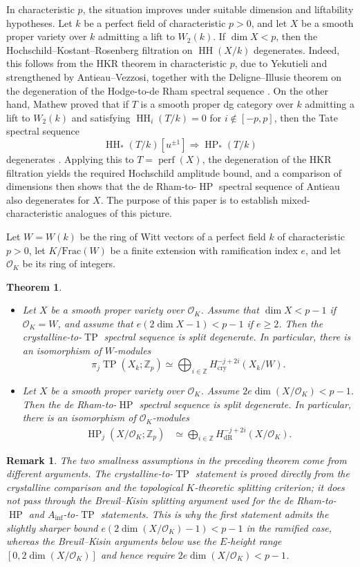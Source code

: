 \documentclass[11pt]{amsart}
\newtheorem{theorem}[lemma]{Theorem}
\newtheorem{remark}[lemma]{Remark}
\numberwithin{equation}{section}
\newcommand{\Z}{\mathbb{Z}}
\newcommand{\sO}{\mathcal{O}}
\newcommand{\dR}{\operatorname{{dR}}}
\newcommand{\perf}{\operatorname{perf}}
\newcommand{\cry}{\operatorname{cry}}
\numberwithin{equation}{section}
\newcommand{\Ainf}{A_{\operatorname{inf}}}
\newcommand{\HH}{\operatorname{HH}}
\newcommand{\TP}{\operatorname{TP}}
\newcommand{\HP}{\operatorname{HP}}
\begin{document}
In characteristic $p$, the situation improves under suitable dimension and liftability hypotheses. Let $k$ be a perfect field of characteristic $p>0$, and let $X$ be a smooth proper variety over $k$ admitting a lift to $W_2(k)$. If $\dim X<p$, then the Hochschild--Kostant--Rosenberg filtration on $\HH(X/k)$ degenerates. Indeed, this follows from the HKR theorem in characteristic $p$, due to Yekutieli and strengthened by Antieau--Vezzosi, together with the Deligne--Illusie theorem on the degeneration of the Hodge-to-de Rham spectral sequence \cite{Y02,AV20,DI87}. On the other hand, Mathew proved that if $T$ is a smooth proper dg category over $k$ admitting a lift to $W_2(k)$ and satisfying $\HH_i(T/k)=0$ for $i\notin[-p,p]$, then the Tate spectral sequence
\[
\HH_*(T/k)[u^{\pm1}] \Longrightarrow \HP_*(T/k)
\]
degenerates \cite[Theorem~1.2]{M20b}. Applying this to $T=\perf(X)$, the degeneration of the HKR filtration yields the required Hochschild amplitude bound, and a comparison of dimensions then shows that the de Rham-to-$\HP$ spectral sequence of Antieau also degenerates for $X$. The purpose of this paper is to establish mixed-characteristic analogues of this picture.

Let $W=W(k)$ be the ring of Witt vectors of a perfect field $k$ of characteristic $p>0$, let $K/\mathrm{Frac}(W)$ be a finite extension with ramification index $e$, and let $\sO_K$ be its ring of integers. 
\begin{theorem}
\begin{itemize}
  \item[(1)] Let $X$ be a smooth proper variety over $\sO_K$. Assume that $\dim X<p-1$ if $\sO_K=W$, and assume that $e(2\dim X-1)<p-1$ if $e\geq 2$. Then the crystalline-to-$\TP$ spectral sequence is split degenerate. In particular, there is an isomorphism of $W$-modules
\[
\pi_j\TP(X_k;\Z_p) \simeq \bigoplus_{i\in\Z} H_{\cry}^{-j+2i}(X_k/W).
\]
  \item[(2)] Let $X$ be a smooth proper variety over $\sO_K$. Assume $2e\dim(X/\sO_K)<p-1$. Then the de Rham-to-$\HP$ spectral sequence is split degenerate. In particular, there is an isomorphism of $\sO_K$-modules
  \begin{align*}
    \HP_j(X/\sO_K;\Z_p)&\simeq \bigoplus_{i\in \Z} H_{\dR}^{-j+2i}(X/\sO_K).
  \end{align*}
\end{itemize}
\end{theorem}

\begin{remark}
The two smallness assumptions in the preceding theorem come from different
arguments.  The crystalline-to-$\TP$ statement is proved directly from the
crystalline comparison and the topological $K$-theoretic splitting criterion; it
does not pass through the Breuil--Kisin splitting argument used for the
de Rham-to-$\HP$ and $\Ainf$-to-$\TP$ statements.  This is why the first
statement admits the slightly sharper bound
$e(2\dim(X/\sO_K)-1)<p-1$ in the ramified case, whereas the Breuil--Kisin
arguments below use the $E$-height range $[0,2\dim(X/\sO_K)]$ and hence
require $2e\dim(X/\sO_K)<p-1$.
\end{remark}
\end{document}
